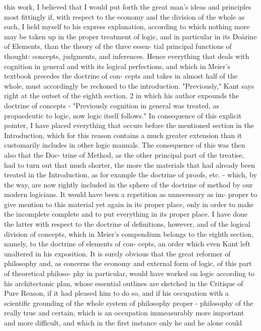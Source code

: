 this work, I believed that I would put forth the great man's ideas and
principles most fittingly if, with respect to the economy and the division of
the whole as such, I held myself to his express explanation, according to
which nothing more may be taken up in the proper treatment of logic, and
in particular in its Doärine of Elements, than the theory of the three essen-
tial principal functions of thought: concepts, judgments, and inferences.
Hence everything that deals with cognition in general and with its logical
perfections, and which in Meier's textbook precedes the doctrine of con-
cepts and takes in almost half of the whole, must accordingly be reckoned
to the introduction. "Previously," Kant says right at the outset of the
eighth section, 2 in which his author expounds the doctrine of concepts -
"Previously cognition in general was treated, as propaedeutic to logic, now
logic itself follows."
In consequence of this explicit pointer, I have placed everything that
occurs before the mentioned section in the Introduction, which for this
reason contains a much greater extension than it customarily includes in
other logic manuals. The consequence of this was then also that the Doc-
trine of Method, as the other principal part of the treatise, had to turn out that
much shorter, the more the materials that had already been treated in the
Introduction, as for example the doctrine of proofs, etc. - which, by the
way, are now rightly included in the sphere of the doctrine of method by our
modern logicians. It would have been a repetition as unnecessary as im-
proper to give mention to this material yet again in its proper place, only in
order to make the incomplete complete and to put everything in its proper
place. I have done the latter with respect to the doctrine of definitions,
however, and of the logical division of concepts, which in Meier's compendium
belongs to the eighth section, namely, to the doctrine of elements of con-
cepts, an order which even Kant left unaltered in his exposition.
It is surely obvious that the great reformer of philosophy and, as concerns
the economy and external form of logic, of this part of theoretical philoso-
phy in particular, would have worked on logic according to his architectonic
plan, whose essential outlines are sketched in the Critique of Pure Reason, if
it had pleased him to do so, and if his occupation with a scientific grounding
of the whole system of philosophy proper - philosophy of the really true
and certain, which is an occupation immeasurably more important and
more difficult, and which in the first instance only he and he alone could
